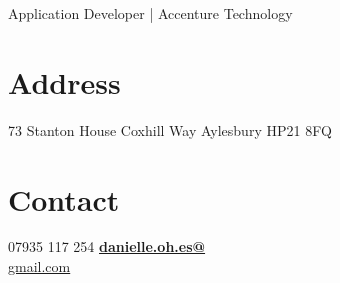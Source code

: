 \documentclass[]{friggeri-cv}
\begin{document}
      {\-\hspace{1.5cm} Application Developer | Accenture Technology}
      

\begin{aside}

    \section{Address}
        73 Stanton House
        Coxhill Way
        Aylesbury
        HP21 8FQ
    ~
    \section{Contact}
        07935 117 254
        \href{mailto:danielle.osullivan@accenture.com}{\textbf{danielle.oh.es@}\\gmail.com}
    ~

\end{aside}
\end{document}
